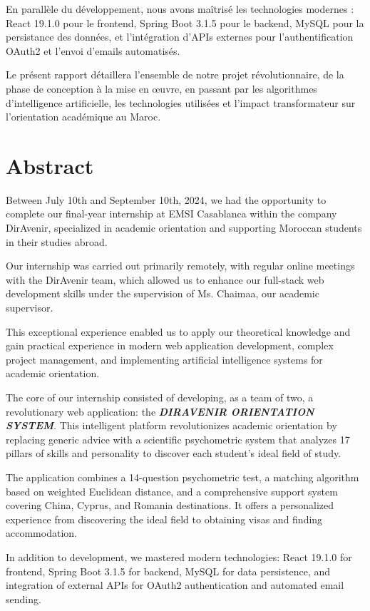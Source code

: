 \documentclass[12pt,a4paper]{report}
\begin{document}
En parallèle du développement, nous avons maîtrisé les technologies modernes : React 19.1.0 pour le frontend, Spring Boot 3.1.5 pour le backend, MySQL pour la persistance des données, et l'intégration d'APIs externes pour l'authentification OAuth2 et l'envoi d'emails automatisés.

Le présent rapport détaillera l'ensemble de notre projet révolutionnaire, de la phase de conception à la mise en œuvre, en passant par les algorithmes d'intelligence artificielle, les technologies utilisées et l'impact transformateur sur l'orientation académique au Maroc.

\chapter*{Abstract}

Between July 10th and September 10th, 2024, we had the opportunity to complete our final-year internship at EMSI Casablanca within the company DirAvenir, specialized in academic orientation and supporting Moroccan students in their studies abroad.

Our internship was carried out primarily remotely, with regular online meetings with the DirAvenir team, which allowed us to enhance our full-stack web development skills under the supervision of Ms. Chaimaa, our academic supervisor.

This exceptional experience enabled us to apply our theoretical knowledge and gain practical experience in modern web application development, complex project management, and implementing artificial intelligence systems for academic orientation.

The core of our internship consisted of developing, as a team of two, a revolutionary web application: the\textit{\textbf{ DIRAVENIR ORIENTATION SYSTEM}}. This intelligent platform revolutionizes academic orientation by replacing generic advice with a scientific psychometric system that analyzes 17 pillars of skills and personality to discover each student's ideal field of study.

The application combines a 14-question psychometric test, a matching algorithm based on weighted Euclidean distance, and a comprehensive support system covering China, Cyprus, and Romania destinations. It offers a personalized experience from discovering the ideal field to obtaining visas and finding accommodation.

In addition to development, we mastered modern technologies: React 19.1.0 for frontend, Spring Boot 3.1.5 for backend, MySQL for data persistence, and integration of external APIs for OAuth2 authentication and automated email sending.
\end{document}
